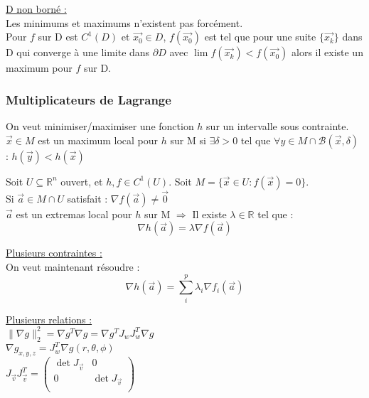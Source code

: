 \documentclass[../main.tex]{subfiles}
\begin{document}
\quad \underline{D non borné :}\\
Les minimums et maximums n'existent pas forcément.\\
Pour $f$ sur D est $C^1(D)$ et $\vec{x_0}\in D$, $f(\vec{x_0})$ est tel que pour une suite $\{\vec{x_k}\}$ dans D qui converge à une limite dans $\partial D$ avec $\lim f(\vec{x_k}) < f(\vec{x_0})$ alors il existe un maximum pour $f$ sur D.\\

\subsubsection{Multiplicateurs de Lagrange}
On veut minimiser/maximiser une fonction $h$ sur un intervalle sous contrainte.\\

$\vec{x} \in M$ est un maximum local pour $h$ sur M si $\exists \delta>0$ tel que $\forall y \in M\cap \mathcal{B}(\vec{x}, \delta)$ : $h(\vec{y}) < h(\vec{x})$\\

\begin{theorem}
Soit $U \subseteq \mathbb{R}^n$ ouvert, et $h, f\in C^1(U)$. Soit $M=\{\vec{x}\in U : f(\vec{x})=0\}$.\\
Si $\vec{a} \in M\cap U$ satisfait : $\nabla f(\vec{a}) \neq \vec{0}$\\
$\vec{a}$ est un extremas local pour $h$ sur M $\Rightarrow$ Il existe $\lambda \in \mathbb{R}$ tel que :\\
\begin{equation}
    \nabla h(\vec{a}) = \lambda \nabla f(\vec{a})
\end{equation}
\end{theorem}

\quad \underline{Plusieurs contraintes :}\\
On veut maintenant résoudre :\\
\begin{equation}
    \nabla h(\vec{a}) = \sum_i^p \lambda_i \nabla f_i(\vec{a})
\end{equation}

\quad \underline{Plusieurs relations :}\\
$\parallel \nabla g\parallel_2^2 = \nabla g^T \nabla g = \nabla g^T J_w J_w^T \nabla g$\\
$\nabla g_{x,y,z} = J_w^T \nabla g(r,\theta, \phi)$\\
$J_{\vec{v}} J_{\vec{v}}^T = \begin{pmatrix}
    \det J_{\vec{v}} &0\\
    0 & \det J_{\vec{v}}\\
\end{pmatrix}$\\
\end{document}
